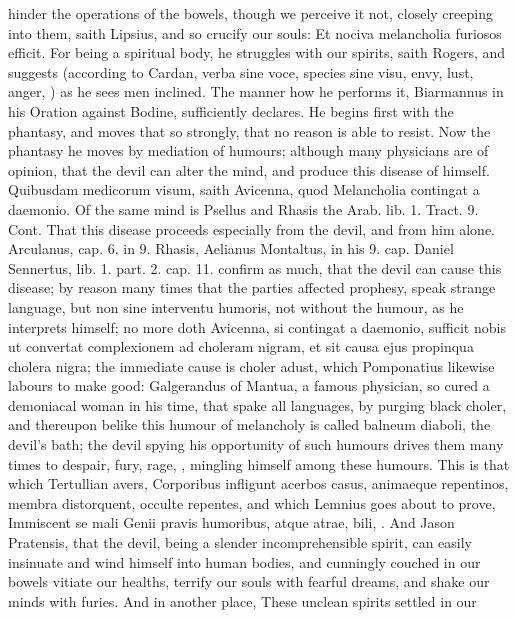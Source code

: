 {hinder the operations of the bowels, though we perceive it not, closely
creeping into them, saith Lipsius, and so crucify our souls: Et
nociva melancholia furiosos efficit. For being a spiritual body, he
struggles with our spirits, saith Rogers, and suggests (according to
Cardan, verba sine voce, species sine visu, envy, lust, anger,
\etc{}) as he sees men inclined.
The manner how he performs it, Biarmannus in his Oration against
Bodine, sufficiently declares. He begins first with the phantasy,
and moves that so strongly, that no reason is able to resist. Now the
phantasy he moves by mediation of humours; although many physicians are
of opinion, that the devil can alter the mind, and produce this disease
of himself. Quibusdam medicorum visum, saith Avicenna, quod
Melancholia contingat a daemonio. Of the same mind is Psellus and
Rhasis the Arab. lib. 1. Tract. 9. Cont. That this disease
proceeds especially from the devil, and from him alone. Arculanus, cap.
6. in 9. Rhasis, Aelianus Montaltus, in his 9. cap. Daniel Sennertus,
lib. 1. part. 2. cap. 11. confirm as much, that the devil can cause
this disease; by reason many times that the parties affected prophesy,
speak strange language, but non sine interventu humoris, not without
the humour, as he interprets himself; no more doth Avicenna, si
contingat a daemonio, sufficit nobis ut convertat complexionem ad
choleram nigram, et sit causa ejus propinqua cholera nigra; the
immediate cause is choler adust, which  Pomponatius likewise
labours to make good: Galgerandus of Mantua, a famous physician, so
cured a demoniacal woman in his time, that spake all languages, by
purging black choler, and thereupon belike this humour of melancholy is
called balneum diaboli, the devil's bath; the devil spying his
opportunity of such humours drives them many times to despair, fury,
rage, \etc{}, mingling himself among these humours. This is that which
Tertullian avers, Corporibus infligunt acerbos casus, animaeque
repentinos, membra distorquent, occulte repentes, \etc{} and which Lemnius
goes about to prove, Immiscent se mali Genii pravis humoribus, atque
atrae, bili, \etc{}. And Jason Pratensis, that the devil, being a
slender incomprehensible spirit, can easily insinuate and wind himself
into human bodies, and cunningly couched in our bowels vitiate our
healths, terrify our souls with fearful dreams, and shake our minds
with furies. And in another place, These unclean spirits settled in our
}
